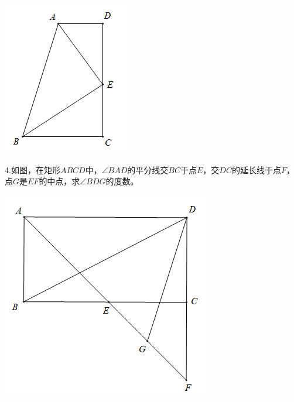 \documentclass[10pt]{ctexart}
\begin{document}
\begin{flushright}
	\includegraphics[scale=0.6]{figure/jiaopfxian16}
\end{flushright}

\begin{shaded}
4.如图，在矩形$ABCD$中，$\angle BAD$的平分线交$BC$于点$E$，交$DC$的延长线于点$F$，点$G$是$EF$的中点，求$\angle BDG$的度数。
\end{shaded}

\begin{flushright}
	\includegraphics[scale=0.6]{figure/jiaopfxian21}
\end{flushright}
\end{document}
